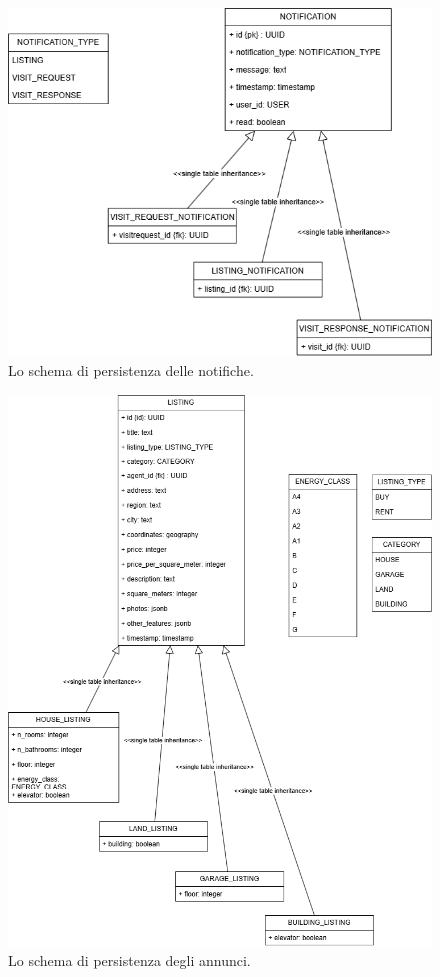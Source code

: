 \begin{figure}[H]
    \centering
    \includegraphics[width=\textwidth]{assets/diagrams/db-scheme/notification.png}
    \caption{Lo schema di persistenza delle notifiche.}
    \label{fig:Schema di persistenza delle notifiche}
\end{figure}

\begin{figure}[H]
    \centering
    \includegraphics[width=\textwidth]{assets/diagrams/db-scheme/listing.png}
    \caption{Lo schema di persistenza degli annunci.}
    \label{fig:Schema di persistenza degli annunci}
\end{figure}

